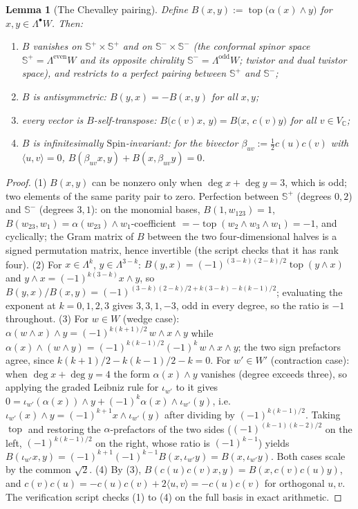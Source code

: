\documentclass[11pt]{article}
\newtheorem{lemma}[theorem]{Lemma}
\theoremstyle{definition}
\theoremstyle{plain}
\newcommand{\changedmark}[2]{\marginpar{\raggedright\scriptsize\color{#1}#2}}
\providecommand{\C}{}\renewcommand{\C}{\mathbb{C}}
\providecommand{\CS}{}\renewcommand{\CS}{{\mathbb{S}^{+}}}
\providecommand{\CSm}{}\renewcommand{\CSm}{{\mathbb{S}^{-}}}
\providecommand{\ip}{}\renewcommand{\ip}[2]{\langle #1, #2\rangle}
\begin{document}
\begin{lemma}[The Chevalley pairing]\label{c:correspondence.chevalley-pairing}
\changedmark{gray}{reworded}
Define $B(x, y) := \operatorname{top}\bigl(\alpha(x) \wedge y\bigr)$ for $x, y \in \Lambda^\bullet W$. Then:
\begin{enumerate}
\item $B$ vanishes on $\CS \times \CS$ and on $\CSm \times \CSm$ (the conformal spinor space $\CS = \Lambda^{\mathrm{even}}W$ and its opposite chirality $\CSm = \Lambda^{\mathrm{odd}}W$; twistor and dual twistor space), and restricts to a perfect pairing between $\CS$ and $\CSm$;
\item $B$ is antisymmetric: $B(y,x) = -B(x,y)$ for all $x, y$;
\item every vector is $B$-self-transpose: $B\bigl(c(v)x,\, y\bigr) = B\bigl(x,\, c(v)y\bigr)$ for all $v \in V_\C$;
\item $B$ is infinitesimally $\mathrm{Spin}$-invariant: for the bivector $\beta_{uv} := \tfrac12 c(u)c(v)$ with $\ip{u}{v} = 0$, $B(\beta_{uv}x, y) + B(x, \beta_{uv}y) = 0$.
\end{enumerate}
\end{lemma}
\begin{proof}
(1) $B(x,y)$ can be nonzero only when $\deg x + \deg y = 3$, which is odd; two elements of the same parity pair to zero. Perfection between $\CS$ (degrees $0,2$) and $\CSm$ (degrees $3,1$): on the monomial bases, $B(1, w_{123}) = 1$, $B(w_{23}, w_1) = \alpha(w_{23})\wedge w_1$-coefficient $= -\operatorname{top}(w_2\wedge w_3\wedge w_1) = -1$, and cyclically; the Gram matrix of $B$ between the two four-dimensional halves is a signed permutation matrix, hence invertible (the script checks that it has rank four).
(2) For $x \in \Lambda^k$, $y \in \Lambda^{3-k}$: $B(y,x) = (-1)^{(3-k)(2-k)/2}\operatorname{top}(y \wedge x)$ and $y\wedge x = (-1)^{k(3-k)}x\wedge y$, so $B(y,x)/B(x,y) = (-1)^{(3-k)(2-k)/2 + k(3-k) - k(k-1)/2}$; evaluating the exponent at $k = 0,1,2,3$ gives $3, 3, 1, -3$, odd in every degree, so the ratio is $-1$ throughout.
(3) For $w \in W$ (wedge case): $\alpha(w \wedge x)\wedge y = (-1)^{k(k+1)/2}\,w\wedge x\wedge y$ while $\alpha(x)\wedge(w\wedge y) = (-1)^{k(k-1)/2}(-1)^k\,w\wedge x\wedge y$; the two sign prefactors agree, since $k(k+1)/2 - k(k-1)/2 - k = 0$. For $w' \in W'$ (contraction case): when $\deg x + \deg y = 4$ the form $\alpha(x)\wedge y$ vanishes (degree exceeds three), so applying the graded Leibniz rule for $\iota_{w'}$ to it gives $0 = \iota_{w'}(\alpha(x))\wedge y + (-1)^k \alpha(x)\wedge \iota_{w'}(y)$, i.e.\ $\iota_{w'}(x)\wedge y = (-1)^{k+1} x \wedge \iota_{w'}(y)$ after dividing by $(-1)^{k(k-1)/2}$. Taking $\operatorname{top}$ and restoring the $\alpha$-prefactors of the two sides ($(-1)^{(k-1)(k-2)/2}$ on the left, $(-1)^{k(k-1)/2}$ on the right, whose ratio is $(-1)^{k-1}$) yields $B(\iota_{w'}x, y) = (-1)^{k+1}(-1)^{k-1} B(x, \iota_{w'}y) = B(x, \iota_{w'}y)$. Both cases scale by the common $\sqrt2$.
(4) By (3), $B(c(u)c(v)x, y) = B(x, c(v)c(u)y)$, and $c(v)c(u) = -c(u)c(v) + 2\ip{u}{v} = -c(u)c(v)$ for orthogonal $u, v$. The verification script checks (1) to (4) on the full basis in exact arithmetic.

\end{proof}
\end{document}
